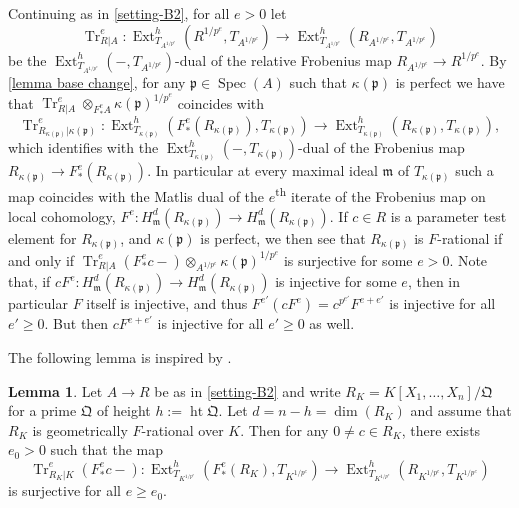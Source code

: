 \documentclass[reqno,11pt]{amsart}
\numberwithin{equation}{section}
\theoremstyle{definition}
\theoremstyle{definition}
\newtheorem{lemma}[theorem]{Lemma}
\theoremstyle{definition}
\theoremstyle{remark}
\newcommand{\Spec}{\operatorname{Spec}}
\newcommand{\ts}{\textsuperscript}
\newcommand{\Ht}{\operatorname{ht}}
\newcommand{\Ext}{\operatorname{Ext}}
\newcommand{\Tr}{\operatorname{Tr}}
\newcommand{\fm}{\mathfrak{m}}
\newcommand{\fp}{\mathfrak{p}}
\newcommand{\fQ}{\mathfrak{Q}}
\begin{document}
Continuing as in \cref{setting-B2}, for all $e > 0$ let
\[
\Tr^e_{R|A}\colon \Ext^h_{T_{A^{1/p^e}}}(R^{1/p^e},T_{A^{1/p^e}}) \to \Ext^h_{T_{A^{1/p^e}}}(R_{A^{1/p^e}},T_{A^{1/p^e}})
\]
be the $\Ext^h_{T_{A^{1/p^e}}}(-,T_{A^{1/p^e}})$-dual of the relative Frobenius map $R_{A^{1/p^e}} \to R^{1/p^e}$. By \cref{lemma base change}, for any $\fp \in \Spec(A)$ such that $\kappa(\fp)$ is perfect we have that $\Tr^e_{R|A} \otimes_{F^e_*A} \kappa(\fp)^{1/p^e}$ coincides with
\[
\Tr^e_{R_{\kappa(\fp)}|\kappa(\fp)}\colon \Ext^h_{T_{\kappa(\fp)}}(F^e_*(R_{\kappa(\fp)}),T_{\kappa(\fp)}) \to \Ext^h_{T_{\kappa(\fp)}}(R_{\kappa(\fp)},T_{\kappa(\fp)}),
\]
which identifies with the $\Ext^h_{T_{\kappa(\fp)}}(-,T_{\kappa(\fp)})$-dual of the Frobenius map $R_{\kappa(\fp)} \to F^e_*(R_{\kappa(\fp)})$. In particular at every maximal ideal $\fm$ of $T_{\kappa(\fp)}$ such a map coincides with the Matlis dual of the $e$\ts{th} iterate of the Frobenius map on local cohomology, $F^e\colon H^d_{\fm}(R_{\kappa(\fp)}) \to H^d_{\fm}(R_{\kappa(\fp)})$. If $c \in R$ is a parameter test element for $R_{\kappa(\fp)}$, and $\kappa(\fp)$ is perfect, we then see that $R_{\kappa(\fp)}$ is $F$-rational if and only if $\Tr^e_{R|A}(F^e_*c -) \otimes_{A^{1/p^e}} \kappa(\fp)^{1/p^e}$ is surjective for some $e >0$. Note that, if $cF^e\colon H^d_{\fm}(R_{\kappa(\fp)}) \to H^d_{\fm}(R_{\kappa(\fp)})$ is injective for some $e$, then in particular $F$ itself is injective, and thus $F^{e'}(cF^e) = c^{p^{e'}}F^{e+e'}$ is injective for all $e' \geq 0$. But then $cF^{e+e'}$ is injective for all $e' \geq 0$ as well.




The following lemma is inspired by \cite[Proposition 2.6]{HH00}.

\begin{lemma} \label{key lemma}
Let $A\to R$ be as in \cref{setting-B2} and write $R_K = K[X_1,\ldots, X_n]/\fQ$ for a prime $\fQ$ of height $h:=\Ht \fQ$. Let $d = n-h = \dim(R_K)$ and assume that $R_K$ is geometrically $F$-rational over $K$. Then for any $0\neq c\in R_K$, there exists $e_0>0$ such that the map 
    \[
    \Tr^e_{R_K|K}(F^e_*c-)\colon \Ext^h_{T_{K^{1/p^e}}}(F^e_*(R_K),T_{K^{1/p^e}}) \to \Ext^h_{T_{K^{1/p^e}}}(R_{K^{1/p^e}},T_{K^{1/p^e}})
    \]
    is surjective for all $e \geq e_0$.
\end{lemma}
\end{document}
